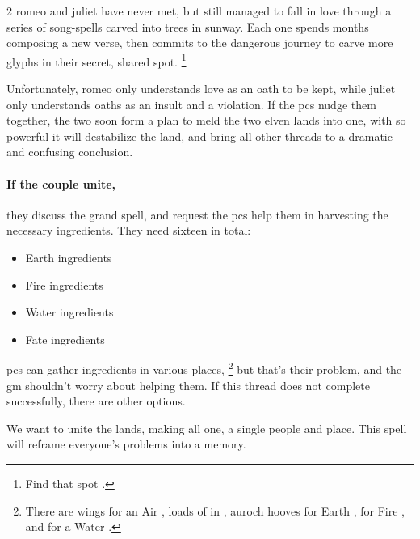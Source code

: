 \begin{multicols}{2}
\noindent
\Gls{romeo} and \gls{juliet} have never met, but still managed to fall in love through a series of song-spells carved into trees in \gls{sunway}.
Each one spends months composing a new verse, then commits to the dangerous journey to carve more glyphs in their secret, shared spot.%
\footnote{Find that spot .}

Unfortunately, \gls{romeo} only understands love as an oath to be kept, while \gls{juliet} only understands oaths as an insult and a violation.
If the \glspl{pc} nudge them together, the two soon form a plan to meld the two elven lands into one, with  so powerful it will destabilize the land, and bring all other threads to a dramatic and confusing conclusion.

\paragraph{If the couple unite,}
they discuss the grand spell, and request the \glspl{pc} help them in \gls{harvesting} the necessary \glspl{ingredient}.
They need sixteen in total:

%
\null
\begin{itemize}
  \item
   Earth \glspl{ingredient}
  \item
   Fire \glspl{ingredient}
  \item
   Water \glspl{ingredient}
  \item
   Fate \glspl{ingredient}
\end{itemize}

\Glspl{pc} can gather \glspl{ingredient} in various places,%
\footnote{There are  wings  for an Air , loads of  in , auroch hooves for Earth  ,  for Fire  , and  for a Water  .}
but that's their problem, and the \gls{gm} shouldn't worry about helping them.
If this \gls{thread} does not complete successfully, there are other options.

\begin{exampletext}
  We want to unite the lands, making all one, a single people and place.
  This \gls{spell} will reframe everyone's problems into a memory.
\end{exampletext}


\end{multicols}
